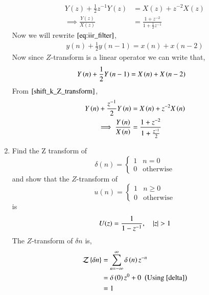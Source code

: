 \documentclass[journal,12pt,twocolumn]{IEEEtran}
\renewcommand\thesection{\arabic{section}}
\begin{document}
\begin{enumerate}[label=\thesection.\arabic*]
\begin{align}
   Y(z) + \frac{1}{2}z^{-1}Y(z) &= X(z)+z^{-2}X(z)
   \\
   \implies \frac{Y(z)}{X(z)} &= \frac{1 + z^{-2}}{1 + \frac{1}{2}z^{-1}}
   \label{eq:freq_resp}
   \end{align}
    \solution 
     Now we will rewrite $\eqref{eq:iir_filter}$,
      \begin{align}
          y(n) + \frac{1}{2}y(n-1) = x(n) + x(n-2)
      \end{align}
     Now since $Z$-transform is a linear operator we can write that,
      \begin{align}
          Y\left(n\right) + \frac{1}{2}Y\left(n-1\right) &= X\left(n\right) + X\left(n-2\right)
      \end{align}
      From $\eqref{shift_k_Z_transform}$,
      \begin{align}
          Y\left(n\right) + \frac{z^{-1}}{2}Y\left(n\right) &= X\left(n\right) + z^{-2}X\left(n\right)\\
       \implies \frac{Y\left(n\right)}{X\left(n\right)} &= \frac{1 + z^{-2}}{1 + \frac{z^{-1}}{2}} 
      \end{align}       
      \item Find the Z transform of 
      \begin{equation}
      \label{delta}
      \delta(n)
      =
      \begin{cases}
      1 & n = 0
      \\
      0 & \text{otherwise}
      \end{cases}
      \end{equation}
      and show that the $Z$-transform of
      \begin{equation}
      \label{eq:unit_step}
      u(n)
      =
      \begin{cases}
      1 & n \ge 0
      \\
      0 & \text{otherwise}
      \end{cases}
      \end{equation}
      is
      \begin{equation}
      U(z) = \frac{1}{1-z^{-1}}, \quad \left\vert z\right\vert > 1
      \end{equation}
      \solution 
      The $Z$-transform of $\delta{n}$ is,
      \begin{align}
          \mathcal{Z}\cbrak{\delta{n}} &= \sum_{n=-\infty}^{\infty}\delta\brak{n}z^{-n}\\
                                       &= \delta\brak{0}z^{0} + 0\,\, \brak{\text{Using \eqref{delta}}}\\
                                       &= 1

\end{align}
\end{enumerate}
\end{document}
